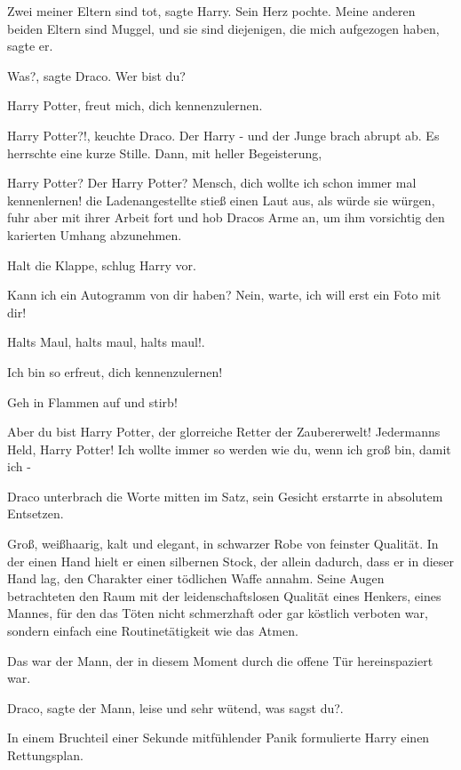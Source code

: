 \glqq{}Zwei meiner Eltern sind tot\grqq{}, sagte Harry. Sein Herz pochte. \glqq{}
Meine anderen beiden Eltern sind Muggel, und sie sind diejenigen, die mich
aufgezogen haben\grqq{}, sagte er.

\glqq{}Was?\grqq{}, sagte Draco. \glqq{}Wer bist du?\grqq{}

\glqq{}Harry Potter, freut mich, dich kennenzulernen.\grqq{}

\glqq{}Harry Potter?!\grqq{}, keuchte Draco. \glqq{}Der Harry -\grqq{} und der
Junge brach abrupt ab. Es herrschte eine kurze Stille. Dann, mit heller
Begeisterung,

\glqq{}Harry Potter? Der Harry Potter? Mensch, dich wollte ich schon immer mal
kennenlernen!\grqq{} die Ladenangestellte stieß einen Laut aus, als würde sie
würgen, fuhr aber mit ihrer Arbeit fort und hob Dracos Arme an, um ihm
vorsichtig den karierten Umhang abzunehmen.

\glqq{}Halt die Klappe\grqq{}, schlug Harry vor.

\glqq{}Kann ich ein Autogramm von dir haben? Nein, warte, ich will erst ein Foto
mit dir!\grqq{}

\glqq{}Halts Maul, halts maul, halts maul!.\grqq{}

\glqq{}Ich bin so erfreut, dich kennenzulernen!\grqq{}

\glqq{}Geh in Flammen auf und stirb!\grqq{}

\glqq{}Aber du bist Harry Potter, der glorreiche Retter der Zaubererwelt!
Jedermanns Held, Harry Potter! Ich wollte immer so werden wie du, wenn ich groß
bin, damit ich -\grqq{}

Draco unterbrach die Worte mitten im Satz, sein Gesicht erstarrte in absolutem
Entsetzen.

Groß, weißhaarig, kalt und elegant, in schwarzer Robe von feinster Qualität. In
der einen Hand hielt er einen silbernen Stock, der allein dadurch, dass er in
dieser Hand lag, den Charakter einer tödlichen Waffe annahm. Seine Augen
betrachteten den Raum mit der leidenschaftslosen Qualität eines Henkers, eines
Mannes, für den das Töten nicht schmerzhaft oder gar köstlich verboten war,
sondern einfach eine Routinetätigkeit wie das Atmen.

Das war der Mann, der in diesem Moment durch die offene Tür hereinspaziert war.

\glqq{}Draco\grqq{}, sagte der Mann, leise und sehr wütend, \glqq{}was sagst
du?\grqq{}.

In einem Bruchteil einer Sekunde mitfühlender Panik formulierte Harry einen
Rettungsplan.

